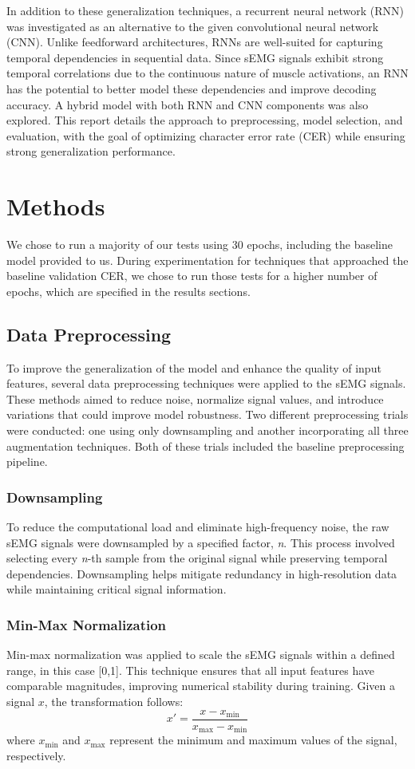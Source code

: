 \documentclass{article}
\begin{document}
In addition to these generalization techniques, a recurrent neural network (RNN) was investigated as an alternative to the given convolutional neural network (CNN). Unlike feedforward architectures, RNNs are well-suited for capturing temporal dependencies in sequential data. Since sEMG signals exhibit strong temporal correlations due to the continuous nature of muscle activations, an RNN has the potential to better model these dependencies and improve decoding accuracy. A hybrid model with both RNN and CNN components was also explored. This report details the approach to preprocessing, model selection, and evaluation, with the goal of optimizing character error rate (CER) while ensuring strong generalization performance.

\section{Methods}
We chose to run a majority of our tests using 30 epochs, including the baseline model provided to us. During experimentation for techniques that approached the baseline validation CER, we chose to run those tests for a higher number of epochs, which are specified in the results sections.
\subsection{Data Preprocessing}
To improve the generalization of the model and enhance the quality of input features, several data preprocessing techniques were applied to the sEMG signals. These methods aimed to reduce noise, normalize signal values, and introduce variations that could improve model robustness.
Two different preprocessing trials were conducted: one using only downsampling and another incorporating all three augmentation techniques. Both of these trials included the baseline preprocessing pipeline.

\subsubsection{Downsampling}
To reduce the computational load and eliminate high-frequency noise, the raw sEMG signals were downsampled by a specified factor, \textit{n}. This process involved selecting every \textit{n}-th sample from the original signal while preserving temporal dependencies. Downsampling helps mitigate redundancy in high-resolution data while maintaining critical signal information.
\subsubsection{Min-Max Normalization}
Min-max normalization was applied to scale the sEMG signals within a defined range, in this case [0,1]. This technique ensures that all input features have comparable magnitudes, improving numerical stability during training. Given a signal $x$, the transformation follows:
\begin{equation}
x' = \frac{x - x_{\min}}{x_{\max} - x_{\min}}
\end{equation}
where $x_{\min}$ and $x_{\max}$ represent the minimum and maximum values of the signal, respectively.
\end{document}
